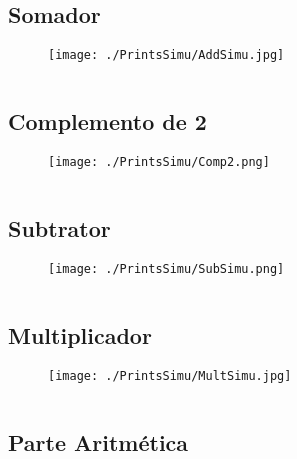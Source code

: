 \inputminted{vhdl}{./.vhdl/logic.vhdl}

\subsection{ Somador\newline} \label{ap:7.2}
\begin{figure}[H] %
    \texttt{[image: ./PrintsSimu/AddSimu.jpg]}
\end{figure}
\inputminted{vhdl}{./.vhdl/add.vhdl}

\subsection{ Complemento de 2\newline} \label{ap:7.3}
\begin{figure}[H] %
    \centering
    \texttt{[image: ./PrintsSimu/Comp2.png]}
\end{figure}
\inputminted{vhdl}{./.vhdl/comp2.vhdl}



\subsection{ Subtrator\newline} \label{ap:7.4}
\begin{figure}[H] %
    \centering
    \texttt{[image: ./PrintsSimu/SubSimu.png]}
\end{figure}
\inputminted{vhdl}{./.vhdl/sub.vhdl}



\subsection{ Multiplicador\newline} \label{ap:7.5}
\begin{figure}[H] %
    \centering
    \texttt{[image: ./PrintsSimu/MultSimu.jpg]}
\end{figure}
\inputminted{vhdl}{./.vhdl/muller4.vhdl}



\subsection{ Parte Aritmética\newline} \label{ap:7.6}

